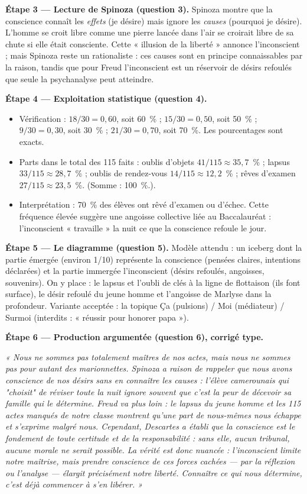 \documentclass[11pt]{article}
\begin{document}
\begin{exoresolu}
\textbf{Étape 3 — Lecture de Spinoza (question 3).} Spinoza montre que la conscience connaît les \emph{effets} (je désire) mais ignore les \emph{causes} (pourquoi je désire). L'homme se croit libre comme une pierre lancée dans l'air se croirait libre de sa chute si elle était consciente. Cette « illusion de la liberté » annonce l'inconscient ; mais Spinoza reste un rationaliste : ces causes sont en principe connaissables par la raison, tandis que pour Freud l'inconscient est un réservoir de désirs refoulés que seule la psychanalyse peut atteindre.

\textbf{Étape 4 — Exploitation statistique (question 4).}
\begin{itemize}
\item Vérification : $18/30 = 0{,}60$, soit 60~\% ; $15/30 = 0{,}50$, soit 50~\% ; $9/30 = 0{,}30$, soit 30~\% ; $21/30 = 0{,}70$, soit 70~\%. Les pourcentages sont exacts.
\item Parts dans le total des 115 faits : oublis d'objets $41/115 \approx 35{,}7$~\% ; lapsus $33/115 \approx 28{,}7$~\% ; oublis de rendez-vous $14/115 \approx 12{,}2$~\% ; rêves d'examen $27/115 \approx 23{,}5$~\%. (Somme : 100~\%.).
\item Interprétation : 70~\% des élèves ont rêvé d'examen ou d'échec. Cette fréquence élevée suggère une angoisse collective liée au Baccalauréat : l'inconscient « travaille » la nuit ce que la conscience refoule le jour.
\end{itemize}

\textbf{Étape 5 — Le diagramme (question 5).} Modèle attendu : un iceberg dont la partie émergée (environ 1/10) représente la conscience (pensées claires, intentions déclarées) et la partie immergée l'inconscient (désirs refoulés, angoisses, souvenirs). On y place : le lapsus et l'oubli de clés à la ligne de flottaison (ils font surface), le désir refoulé du jeune homme et l'angoisse de Marlyse dans la profondeur. Variante acceptée : la topique Ça (pulsions) / Moi (médiateur) / Surmoi (interdits : « réussir pour honorer papa »).

\textbf{Étape 6 — Production argumentée (question 6), corrigé type.}

\emph{« Nous ne sommes pas totalement maîtres de nos actes, mais nous ne sommes pas pour autant des marionnettes. Spinoza a raison de rappeler que nous avons conscience de nos désirs sans en connaître les causes : l'élève camerounais qui "choisit" de réviser toute la nuit ignore souvent que c'est la peur de décevoir sa famille qui le détermine. Freud va plus loin : le lapsus du jeune homme et les 115 actes manqués de notre classe montrent qu'une part de nous-mêmes nous échappe et s'exprime malgré nous. Cependant, Descartes a établi que la conscience est le fondement de toute certitude et de la responsabilité : sans elle, aucun tribunal, aucune morale ne serait possible. La vérité est donc nuancée : l'inconscient limite notre maîtrise, mais prendre conscience de ces forces cachées — par la réflexion ou l'analyse — élargit précisément notre liberté. Connaître ce qui nous détermine, c'est déjà commencer à s'en libérer. »}


\end{exoresolu}
\end{document}
